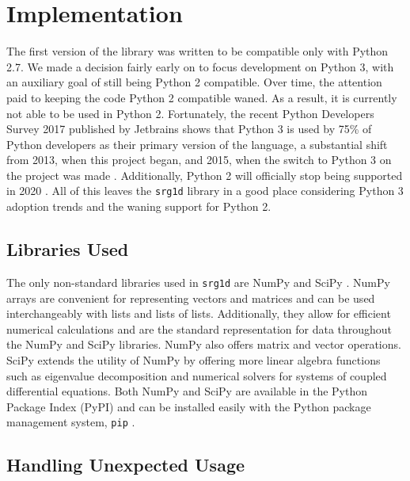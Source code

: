 \section{Implementation}

The first version of the library was written to be compatible only with Python 2.7. We made a decision fairly early on to focus development on Python 3, with an auxiliary goal of still being Python 2 compatible. Over time, the attention paid to keeping the code Python 2 compatible waned. As a result, it is currently not able to be used in Python 2. Fortunately, the recent Python Developers Survey 2017 published by Jetbrains shows that Python 3 is used by 75\% of Python developers as their primary version of the language, a substantial shift from 2013, when this project began, and 2015, when the switch to Python 3 on the project was made \cite{PythonDevelopersSurvey}. Additionally, Python 2 will officially stop being supported in 2020 \cite{Python2EOL}. All of this leaves the \texttt{srg1d} library in a good place considering Python 3 adoption trends and the waning support for Python 2.

\subsection{Libraries Used}

The only non-standard libraries used in \texttt{srg1d} are NumPy \cite{oliphant2006guide} and SciPy \cite{SciPy}. NumPy arrays are convenient for representing vectors and matrices and can be used interchangeably with lists and lists of lists. Additionally, they allow for efficient numerical calculations and are the standard representation for data throughout the NumPy and SciPy libraries. NumPy also offers matrix and vector operations. SciPy extends the utility of NumPy by offering more linear algebra functions such as eigenvalue decomposition and numerical solvers for systems of coupled differential equations. Both NumPy and SciPy are available in the Python Package Index (PyPI) and can be installed easily with the Python package management system, \texttt{pip} \cite{pypi}.

\subsection{Handling Unexpected Usage}

